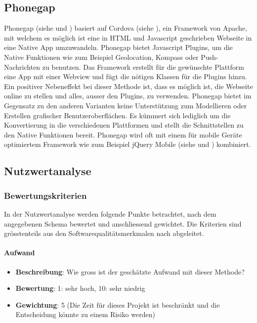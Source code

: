 \subsection{Phonegap}\label{architektur_phonegapt}
Phonegap (siehe \cite{phonegap} und \cite{wargo2012phonegap}) basiert auf Cordova (siehe \cite{cordova}), ein Framework von Apache, mit welchem es möglich ist eine in HTML und Javascript geschrieben Webseite in eine Native App umzuwandeln. Phonegap bietet Javascript Plugins, um die Native Funktionen wie zum Beispiel Geolocation, Kompass oder Push-Nachrichten zu benutzen. Das Framework erstellt für die gewünschte Plattform eine App mit einer Webview und fügt die nötigen Klassen für die Plugins hinzu. Ein positiver Nebeneffekt bei dieser Methode ist, dass es möglich ist, die Webseite online zu stellen und alles, ausser den Plugins, zu verwenden. Phonegap bietet im Gegensatz zu den anderen Varianten keine Unterstützung zum Modellieren oder Erstellen grafischer Benutzeroberflächen. Es kümmert sich lediglich um die Konvertierung in die verschiedenen Plattformen und stellt die Schnittstellen zu den Native Funktionen bereit. Phonegap wird oft mit einem für mobile Geräte optimiertem Framework wie zum Beispiel jQuery Mobile (siehe \cite{jquery_mobile} und \cite{reid2011jquery}) kombiniert.

\newpage
\subsection{Nutzwertanalyse}\label{architektur_nutzwertanalyse}

\subsubsection{Bewertungskriterien}\label{architektur_bewertungspunkte}

In der Nutzwertanalyse werden folgende Punkte betrachtet, nach dem angegebenen Schema bewertet und anschliessend gewichtet. Die Kriterien sind grösstenteils aus den Softwarequalitätsmerkmalen nach \cite{iso_9126} abgeleitet.

\paragraph{Aufwand}
\begin{itemize}
	\item \textbf{Beschreibung}: Wie gross ist der geschätzte Aufwand mit dieser Methode?
	\item \textbf{Bewertung}: 1: sehr hoch, 10: sehr niedrig
	\item \textbf{Gewichtung}: 5 (Die Zeit für dieses Projekt ist beschränkt und die Entscheidung könnte zu einem Risiko werden)
\end{itemize}

